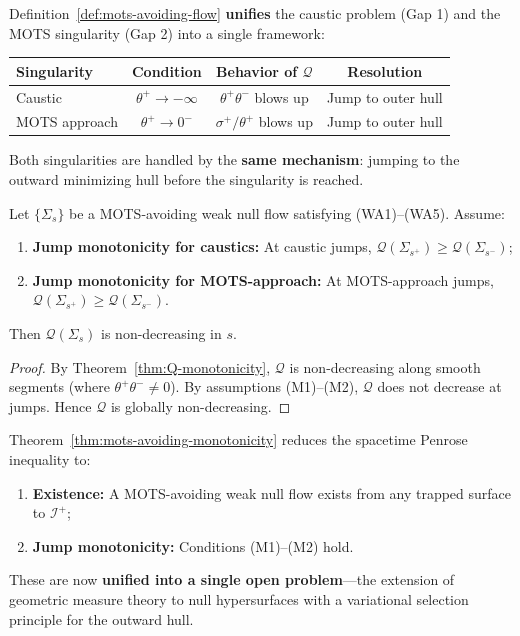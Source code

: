\begin{remark}
Definition~\ref{def:mots-avoiding-flow} \textbf{unifies} the caustic problem (Gap 1) and the MOTS singularity (Gap 2) into a single framework:
\begin{center}
\begin{tabular}{l|c|c|c}
\toprule
\textbf{Singularity} & \textbf{Condition} & \textbf{Behavior of $\mathcal{Q}$} & \textbf{Resolution} \\
\midrule
Caustic & $\theta^+ \to -\infty$ & $\theta^+\theta^-$ blows up & Jump to outer hull \\
MOTS approach & $\theta^+ \to 0^-$ & $\sigma^+/\theta^+$ blows up & Jump to outer hull \\
\bottomrule
\end{tabular}
\end{center}
Both singularities are handled by the \textbf{same mechanism}: jumping to the outward minimizing hull before the singularity is reached.
\end{remark}

\begin{theorem}
\label{thm:mots-avoiding-monotonicity}
Let $\{\Sigma_s\}$ be a MOTS-avoiding weak null flow satisfying (WA1)--(WA5). Assume:
\begin{enumerate}[label=\textbf{(M\arabic*)}]
\item \textbf{Jump monotonicity for caustics:} At caustic jumps, $\mathcal{Q}(\Sigma_{s^+}) \geq \mathcal{Q}(\Sigma_{s^-})$;
\item \textbf{Jump monotonicity for MOTS-approach:} At MOTS-approach jumps, $\mathcal{Q}(\Sigma_{s^+}) \geq \mathcal{Q}(\Sigma_{s^-})$.
\end{enumerate}
Then $\mathcal{Q}(\Sigma_s)$ is non-decreasing in $s$.
\end{theorem}

\begin{proof}
By Theorem~\ref{thm:Q-monotonicity}, $\mathcal{Q}$ is non-decreasing along smooth segments (where $\theta^+\theta^- \neq 0$). By assumptions (M1)--(M2), $\mathcal{Q}$ does not decrease at jumps. Hence $\mathcal{Q}$ is globally non-decreasing.
\end{proof}

\begin{remark}
Theorem~\ref{thm:mots-avoiding-monotonicity} reduces the spacetime Penrose inequality to:
\begin{enumerate}
\item \textbf{Existence:} A MOTS-avoiding weak null flow exists from any trapped surface to $\mathscr{I}^+$;
\item \textbf{Jump monotonicity:} Conditions (M1)--(M2) hold.
\end{enumerate}
These are now \textbf{unified into a single open problem}---the extension of geometric measure theory to null hypersurfaces with a variational selection principle for the outward hull.
\end{remark}

